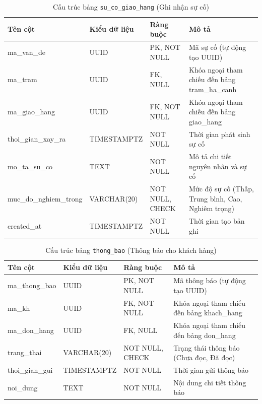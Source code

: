 \begin{table}[H]
  \centering
  \begin{tabularx}{\textwidth}{|l|l|l|>{\raggedright\arraybackslash}X|}
    \hline
    \textbf{Tên cột} & \textbf{Kiểu dữ liệu} & \textbf{Ràng buộc} & \textbf{Mô tả} \\
    \hline
    ma\_van\_de          & UUID            & PK, NOT NULL    & Mã sự cố (tự động tạo UUID) \\ \hline
    ma\_tram             & UUID            & FK, NULL        & Khóa ngoại tham chiếu đến bảng tram\_ha\_canh \\ \hline
    ma\_giao\_hang       & UUID            & FK, NOT NULL    & Khóa ngoại tham chiếu đến bảng giao\_hang \\ \hline
    thoi\_gian\_xay\_ra  & TIMESTAMPTZ     & NOT NULL        & Thời gian phát sinh sự cố \\ \hline
    mo\_ta\_su\_co       & TEXT            & NOT NULL        & Mô tả chi tiết nguyên nhân và sự cố \\ \hline
    muc\_do\_nghiem\_trong & VARCHAR(20)     & NOT NULL, CHECK & Mức độ sự cố (Thấp, Trung bình, Cao, Nghiêm trọng) \\ \hline
    created\_at          & TIMESTAMPTZ     & NOT NULL        & Thời gian tạo bản ghi \\
    \hline
  \end{tabularx}
  \caption{Cấu trúc bảng \texttt{su\_co\_giao\_hang} (Ghi nhận sự cố)}
  \label{tab:db-su-co-giao-hang}
\end{table}

\begin{table}[H]
  \centering
  \begin{tabularx}{\textwidth}{|l|l|l|>{\raggedright\arraybackslash}X|}
    \hline
    \textbf{Tên cột} & \textbf{Kiểu dữ liệu} & \textbf{Ràng buộc} & \textbf{Mô tả} \\
    \hline
    ma\_thong\_bao       & UUID            & PK, NOT NULL    & Mã thông báo (tự động tạo UUID) \\ \hline
    ma\_kh               & UUID            & FK, NOT NULL    & Khóa ngoại tham chiếu đến bảng khach\_hang \\ \hline
    ma\_don\_hang        & UUID            & FK, NULL        & Khóa ngoại tham chiếu đến bảng don\_hang \\ \hline
    trang\_thai          & VARCHAR(20)     & NOT NULL, CHECK & Trạng thái thông báo (Chưa đọc, Đã đọc) \\ \hline
    thoi\_gian\_gui      & TIMESTAMPTZ     & NOT NULL        & Thời gian gửi thông báo \\ \hline
    noi\_dung            & TEXT            & NOT NULL        & Nội dung chi tiết thông báo \\
    \hline
  \end{tabularx}
  \caption{Cấu trúc bảng \texttt{thong\_bao} (Thông báo cho khách hàng)}
  \label{tab:db-thong-bao}
\end{table}

